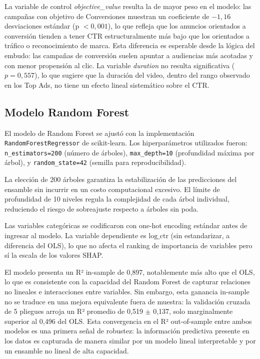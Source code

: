 \documentclass[12pt, a4paper]{report}
\begin{document}
La variable de control \textit{objective\_value} resulta la de mayor peso en el modelo:
las campañas con objetivo de Conversiones muestran un coeficiente de $-1{,}16$ desviaciones
estándar (p $< 0{,}001$), lo que refleja que los anuncios orientados a conversión tienden a
tener CTR estructuralmente más bajo que los orientados a tráfico o reconocimiento de marca.
Esta diferencia es esperable desde la lógica del embudo: las campañas de conversión
suelen apuntar a audiencias más acotadas y con menor propensión al clic. La variable
\textit{duration} no resulta significativa ($p = 0{,}557$), lo que sugiere que la duración
del video, dentro del rango observado en los Top Ads, no tiene un efecto lineal sistemático
sobre el CTR.

\subsection{Modelo Random Forest}

\begin{sloppypar}
El modelo de Random Forest se ajustó con la implementación \texttt{Random\-Forest\-Regressor}
de scikit-learn. Los hiperparámetros utilizados fueron: \texttt{n\_estimators=200}
(número de árboles), \texttt{max\_depth=10} (profundidad máxima por árbol),
y \texttt{random\_state=42} (semilla para reproducibilidad).
\end{sloppypar} La elección de
200 árboles garantiza la estabilización de las predicciones del ensamble sin incurrir en un
costo computacional excesivo. El límite de profundidad de 10 niveles regula la complejidad
de cada árbol individual, reduciendo el riesgo de sobreajuste respecto a árboles sin poda.

Las variables categóricas se codificaron con one-hot encoding estándar antes de ingresar al
modelo. La variable dependiente es $\text{log\_ctr}$ (sin estandarizar, a diferencia del
OLS), lo que no afecta el ranking de importancia de variables pero sí la escala de los
valores SHAP.

El modelo presenta un R² in-sample de 0{,}897, notablemente más alto que el OLS, lo que es
consistente con la capacidad del Random Forest de capturar relaciones no lineales e
interacciones entre variables. Sin embargo, esta ganancia in-sample no se traduce en una
mejora equivalente fuera de muestra: la validación cruzada de 5 pliegues arroja un R²
promedio de 0{,}519 $\pm$ 0{,}137, solo marginalmente superior al 0{,}496 del OLS. Esta
convergencia en el R² out-of-sample entre ambos modelos es una primera señal de robustez:
la información predictiva presente en los datos es capturada de manera similar por un modelo
lineal interpretable y por un ensamble no lineal de alta capacidad.
\end{document}
